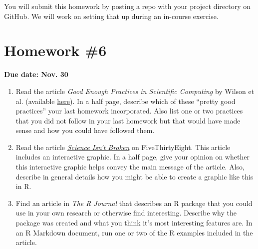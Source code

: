 \documentclass[]{book}
\theoremstyle{definition}
\theoremstyle{definition}
\theoremstyle{definition}
\theoremstyle{remark}
\begin{document}
You will submit this homework by posting a repo with your project
directory on GitHub. We will work on setting that up during an in-course
exercise.

\section{Homework \#6}\label{homework-6}

\textbf{Due date: Nov. 30}

\begin{enumerate}
\def\labelenumi{\arabic{enumi}.}
\item
  Read the article \emph{Good Enough Practices in Scientific Computing}
  by Wilson et al. (available
  \href{https://arxiv.org/abs/1609.00037}{here}). In a half page,
  describe which of these ``pretty good practices'' your last homework
  incorporated. Also list one or two practices that you did not follow
  in your last homework but that would have made sense and how you could
  have followed them.
\item
  Read the article
  \href{http://fivethirtyeight.com/features/science-isnt-broken/}{\emph{Science
  Isn't Broken}} on FiveThirtyEight. This article includes an
  interactive graphic. In a half page, give your opinion on whether this
  interactive graphic helps convey the main message of the article.
  Also, describe in general details how you might be able to create a
  graphic like this in R.
\item
  Find an article in \emph{The R Journal} that describes an R package
  that you could use in your own research or otherwise find interesting.
  Describe why the package was created and what you think it's most
  interesting features are. In an R Markdown document, run one or two of
  the R examples included in the article.
\end{enumerate}



\backmatter
\printindex
\end{document}
